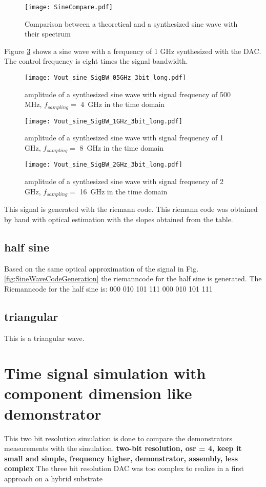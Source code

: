 \begin{figure}[htb!]
	\centering
  \texttt{[image: SineCompare.pdf]}
	\caption{Comparison between a theoretical and a synthesized sine wave with their spectrum}
	\label{fig:SineCompare}
\end{figure}


Figure \ref{fig:1GHz sine} shows a sine wave with a frequency of 1 GHz synthesized with the DAC. The control frequency is eight times the signal bandwidth.
\begin{figure}[htb!]
   \centering
   \texttt{[image: Vout\_sine\_SigBW\_05GHz\_3bit\_long.pdf]}
   \caption{amplitude of a synthesized sine wave with signal frequency of 500 MHz, $f_{sampling} =$ \SI{4}{\GHz} in the time domain}
   \label{fig:05GHz sine}
\end{figure}
\begin{figure}[htb!]
   \centering
   \texttt{[image: Vout\_sine\_SigBW\_1GHz\_3bit\_long.pdf]}
   \caption{amplitude of a synthesized sine wave with signal frequency of 1 GHz, $f_{sampling} =$ \SI{8}{\GHz} in the time domain}
   \label{fig:1GHz sine}
\end{figure}
\begin{figure}[htb!]
   \centering
   \texttt{[image: Vout\_sine\_SigBW\_2GHz\_3bit\_long.pdf]}
   \caption{amplitude of a synthesized sine wave with signal frequency of 2 GHz, $f_{sampling} =$ \SI{16}{\GHz} in the time domain}
   \label{fig:2GHz sine}
\end{figure}




This signal is generated with the riemann code. This riemann code was obtained by hand with optical estimation with the slopes obtained from the table.
\subsection{half sine}
Based on the same optical approximation of the signal in Fig. \ref{fig:SineWaveCodeGeneration} the riemanncode for the half sine is generated. The Riemanncode for the half sine is: 000 010 101 111 000 010 101 111
\subsection{triangular}
This is a triangular wave.


\section{Time signal simulation with component dimension like demonstrator}
This two bit resolution simulation is done to compare the demonstrators measurements with the simulation. \textbf{two-bit resolution, osr = 4, keep it small and simple, frequency higher, demonstrator, assembly, less complex} 
The three bit resolution DAC was too complex to realize in a first approach on a hybrid substrate
